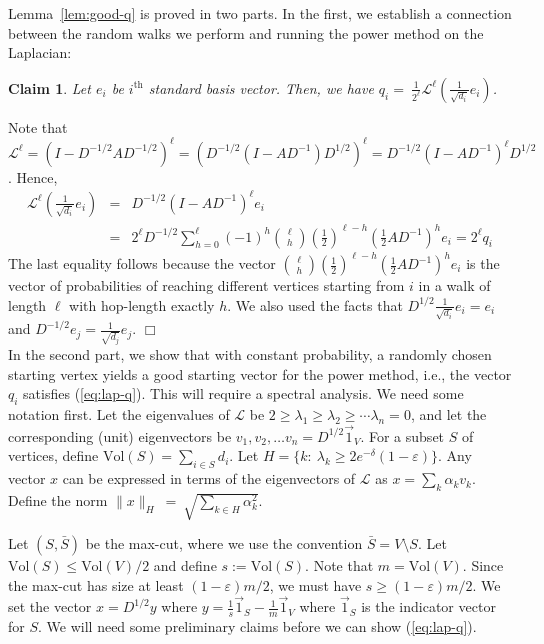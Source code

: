 \documentclass[11pt]{article}
\newtheorem{claim}[theorem]{Claim}
\newenvironment{myproof}{\noindent {\sc Proof:}}{$\Box$}
\def\epsilon{\varepsilon}
\def\lap{{\mathcal L}}
\newcommand\qi{q_i}
\def\Dhalf{D^{1/2}}
\def\Dhalfinv{D^{-1/2}}
\def\vol{\text{Vol}}
\begin{document}
Lemma~\ref{lem:good-q} is proved in two parts. In the first, we establish a connection
between the random walks we perform and running the power method on the
Laplacian:
\begin{claim} \label{lem:lap-rw} Let $e_i$ be $i^\text{th}$ standard basis vector. Then, we
have
$\qi =\ \frac{1}{2^\ell} \lap^\ell \left(\frac{1}{\sqrt{d_i}}e_i\right)$.
\end{claim}
\begin{myproof} Note that $\lap^\ell = (I - \Dhalfinv A \Dhalfinv)^\ell = (\Dhalfinv(I -
AD^{-1})\Dhalf)^\ell = \Dhalfinv(I - AD^{-1})^\ell\Dhalf$. Hence,
\begin{eqnarray*}
\lap^\ell\left(\frac{1}{\sqrt{d_i}}e_i\right) & = & \Dhalfinv(I - AD^{-1})^\ell e_i \\
& = & 2^\ell \Dhalfinv\sum_{h=0}^\ell (-1)^h{\ell \choose h} \left(\frac{1}{2}\right)^{\ell - h} \left(\frac{1}{2}AD^{-1}\right)^h e_i  = 2^\ell \qi
\end{eqnarray*}
The last equality follows because the vector ${\ell \choose h}
\left(\frac{1}{2}\right)^{\ell - h} \left(\frac{1}{2}AD^{-1}\right)^h e_i$ is
the vector of probabilities of reaching different vertices starting from $i$ in a walk of length $\ell$ with hop-length exactly $h$. We also used the
facts that $\Dhalf \frac{1}{\sqrt{d_i}} e_i = e_i$ and $\Dhalfinv e_j =
\frac{1}{\sqrt{d_j}} e_j$.
\end{myproof}\\




In the second part, we show that with constant probability, a randomly chosen starting vertex yields a good starting vector for the power method, i.e., the vector $\qi$ satisfies (\ref{eq:lap-q}). This will require a spectral analysis.  We need some notation first.
Let the eigenvalues of $\lap$ be $2 \geq \lambda_1 \geq \lambda_2 \geq \cdots
\lambda_n = 0$, and let the corresponding (unit) eigenvectors be $v_1, v_2,
\ldots v_n = \Dhalf \vec{1}_V$.
For a subset $S$ of vertices, define $\vol(S) = \sum_{i \in S} d_i$. Let $H =
\{k:\ \lambda_k \geq 2e^{-\delta}(1-\epsilon)\}$. Any vector $x$ can be
expressed in terms of the eigenvectors of $\lap$ as $x = \sum_k \alpha_k v_k$.
Define the norm $\|x\|_H\ =\ \sqrt{\sum_{k \in H} \alpha_k^2}$.

Let $(S, \bar{S})$ be the max-cut, where we use the convention $\bar{S} = V \setminus S$. Let $\vol(S) \leq \vol(V)/2$ and define
$s := \vol(S)$. Note that $m = \vol(V)$. Since the max-cut has size at least $(1-\epsilon)m/2$, we must have $s \geq (1-\epsilon)m/2$.
We set the vector $x = \Dhalf y$ where $y = \frac{1}{s}\vec{1}_S - \frac{1}{m}\vec{1}_V$
where $\vec{1}_S$ is the indicator vector for $S$. We will need some
preliminary claims before we can show (\ref{eq:lap-q}).
\end{document}
